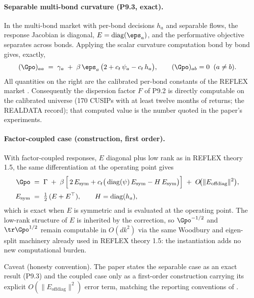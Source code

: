\paragraph{Separable multi-bond curvature (P9.3, exact).}
In the multi-bond market with per-bond decisions $h_a$ and separable
flows, the response Jacobian is diagonal,
$E = \operatorname{diag}(\eps_a)$, and the performative objective
separates across bonds. Applying the scalar curvature computation
\citep{reflex2026} bond by bond gives, exactly,
\begin{equation*}
(\Gpo)_{aa} \;=\; \gamma_a \;+\; \beta\,\eps_a\,
\big( 2 + c_t\,\psi_a - c_t\,h_a \big),
\qquad (\Gpo)_{ab} = 0 \;\; (a \ne b).
\end{equation*}
All quantities on the right are the calibrated per-bond constants of
the REFLEX market \citep{reflex2026}. Consequently the
dispersion factor $F$ of P9.2 is directly computable on the calibrated
universe (170 CUSIPs with at least twelve months of returns; the
REALDATA record); that computed value is the number quoted in the
paper's experiments.

\paragraph{Factor-coupled case (construction, first order).}
With factor-coupled responses, $E$ diagonal plus low rank as in REFLEX
theory 1.5, the same differentiation at the operating point gives
\begin{equation*}
\begin{aligned}
\Gpo \;&=\; \Gamma \;+\; \beta\,\Big[\, 2\,E_{\mathrm{sym}}
+ c_t\big( \operatorname{diag}(\psi)\,E_{\mathrm{sym}}
- H\,E_{\mathrm{sym}} \big) \Big]
\;+\; O\!\big(\|E_{\mathrm{offdiag}}\|^2\big), \\[2pt]
E_{\mathrm{sym}} \;&=\; \tfrac{1}{2}\,(E + E^{\top}), \qquad
H = \operatorname{diag}(h_a),
\end{aligned}
\end{equation*}
which is exact when $E$ is symmetric and is evaluated at the operating
point. The low-rank structure of $E$ is inherited by the correction, so
$\Gpo^{-1/2}$ and $\tr \Gpo^{1/2}$ remain computable in $O(d k^2)$ via
the same Woodbury and eigen-split machinery already used in REFLEX
theory 1.5: the instantiation adds no new computational burden.

Caveat (honesty convention). The paper states the separable case as an
exact result (P9.3) and the coupled case only as a first-order
construction carrying its explicit $O(\|E_{\mathrm{offdiag}}\|^2)$ error
term, matching the reporting conventions of \citet{reflex2026}.

